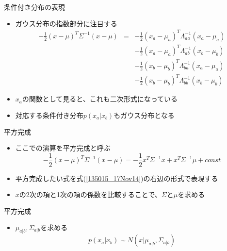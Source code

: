             \begin{frame}{条件付き分布の表現}
             \begin{itemize}
              \item ガウス分布の指数部分に注目する
                    \begin{eqnarray*}
                     -\frac{1}{2}(x - \mu)^{T}\Sigma^{-1}(x-\mu) &= &
                      -\frac{1}{2}(x_a - \mu_a)^{T}\Lambda_{aa}^{-1}(x_a-\mu_a) \\
                     &&-\frac{1}{2}(x_a - \mu_a)^{T}\Lambda_{ab}^{-1}(x_b-\mu_b) \\
                     &&-\frac{1}{2}(x_b - \mu_b)^{T}\Lambda_{ba}^{-1}(x_a-\mu_a) \\
                     &&-\frac{1}{2}(x_b - \mu_b)^{T}\Lambda_{bb}^{-1}(x_b-\mu_b)
                    \end{eqnarray*}
              \item $x_a$の関数として見ると、これも二次形式になっている
              \item 対応する条件付き分布$p(x_a | x_b)$もガウス分布となる
             \end{itemize}
            \end{frame}

              \begin{frame}{平方完成}
               \begin{itemize}
                \item ここでの演算を\alert{平方完成}と呼ぶ
                      \begin{equation}
                       -\frac{1}{2}(x-\mu)^{T}\Sigma^{-1}(x-\mu) = -\frac{1}{2}x^T\Sigma^{-1}x+x^T\Sigma^{-1}\mu + const\label{135015_17Nov14}
                      \end{equation}
                \item 平方完成したい式を式(\ref{135015_17Nov14})の右辺の形式で表現する
                \item $x$の2次の項と1次の項の係数を比較することで、$\Sigma$と$\mu$を求める
               \end{itemize}
              \end{frame}

                \begin{frame}{平方完成}
                 \begin{itemize}
                  \item $\mu_{a|b}, \Sigma_{a|b}$を求める
                        \begin{equation}
                         p(x_a | x_b) \sim N(x | \mu_{a|b}, \Sigma_{a|b})
                        \end{equation}
                 \end{itemize}
                \end{frame}

